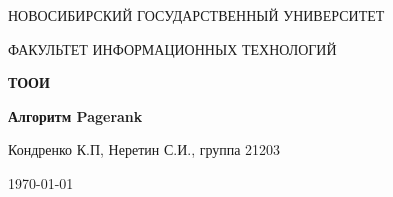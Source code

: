 \begin{center}
	{\LARGE \textsc{НОВОСИБИРСКИЙ ГОСУДАРСТВЕННЫЙ УНИВЕРСИТЕТ}\par}
	{\textsc{ФАКУЛЬТЕТ ИНФОРМАЦИОННЫХ ТЕХНОЛОГИЙ}\par}
	
	\vspace{3cm}
	
	{\huge\bfseries ТООИ\par}
	
	\vspace{1cm}
	
	{\Large\bfseries Алгоритм Pagerank\par}
	
	\vspace{10cm}
	
	\begin{flushright}
		Кондренко К.П, Неретин С.И., группа 21203
	\end{flushright}
	
	\vfill
	
	{\large \today\par}
\end{center}
